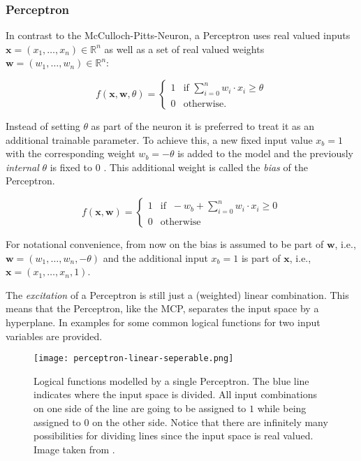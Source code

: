 \subsubsection{Perceptron}

In contrast to the McCulloch-Pitts-Neuron, a Perceptron uses real valued inputs $\bm{x} = (x_1, \dots, x_n) \in \mathbb{R}^n$ as well as a set of real valued weights $\bm{w} = (w_1, \dots, w_n) \in \mathbb{R}^n$:

\begin{equation}
    f(\bm{x}, \bm{w}, \theta) =
    \begin{cases}
        1 & \text{if } \sum_{i=0}^n w_i \cdot x_i \geq \theta \\
        0 & \text{otherwise.}
    \end{cases}
\end{equation}

Instead of setting $\theta$ as part of the neuron it is preferred to treat it as an additional trainable parameter.
To achieve this, a new fixed input value $x_b = 1$ with the corresponding weight $w_b = -\theta$ is added to the model and the previously \emph{internal} $\theta$ is fixed to $0$ .
This additional weight is called the \textit{bias} of the Perceptron.

\begin{equation}
    \label{eq:full-perceptron}
    f(\bm{x}, \bm{w}) =
    \begin{cases}
        1 & \text{if } ~ -w_b + \sum_{i=0}^n w_i \cdot x_i \geq 0 \\
        0 & \text{otherwise}
    \end{cases}
\end{equation}

For notational convenience, from now on the bias is assumed to be part of $\bm{w}$, i.e., $\bm{w} = (w_1, \dots, w_n, -\theta)$ and the additional input $x_b = 1$ is part of $\bm{x}$, i.e., $\bm{x} = (x_1, \dots, x_n, 1)$.

The \textit{excitation} of a Perceptron is still just a (weighted) linear combination.
This means that the Perceptron, like the MCP, separates the input space by a hyperplane.
In  examples for some common logical functions for two input variables are provided.

\begin{figure}[htb!]
    \texttt{[image: perceptron-linear-seperable.png]}
    \caption{Logical functions modelled by a single Perceptron. The blue line indicates where the input space is divided. All input combinations on one side of the line are going to be assigned to $1$ while being assigned to $0$ on the other side. Notice that there are infinitely many possibilities for dividing lines since the input space is real valued. Image taken from \cite{rudolph_lecture_2018}.}
    \label{fig:perceptron-logic}
\end{figure}

